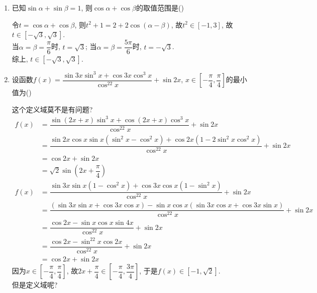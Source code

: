 \begin{enumerate}
\item 已知$\sin\alpha+\sin\beta=1$, 则$\cos\alpha+\cos\beta$的取值范围是\dotfill()
\begin{jieda}
令$t=\cos\alpha+\cos\beta$, 则$t^2+1=2+2\cos(\alpha-\beta)$, 故$t^2\in[-1,3]$, 故$t\in[-\sqrt{3},\sqrt{3}]$. \\
当$\alpha=\beta=\dfrac{\pi}{6}$时, $t=\sqrt{3}$; 当$\alpha=\beta=\dfrac{5\pi}{6}$时, $t=-\sqrt{3}$. \\
综上, $t\in[-\sqrt{3},\sqrt{3}]$. 
\end{jieda}


\item 设函数$f(x)=\dfrac{\sin3x\sin^3x+\cos3x\cos^3x}{\cos^22x}+\sin2x$, $x\in\left[-\dfrac{\pi}{4},\dfrac{\pi}{4}\right]$的最小值为\dotfill()
\begin{jieda}
这个定义域莫不是有问题? 
\begin{align*}
f(x)
& = \dfrac{\sin(2x+x)\sin^3x+\cos(2x+x)\cos^3x}{\cos^22x}+\sin2x\\
& = \dfrac{\sin2x\cos{x}\sin{x}(\sin^2x-\cos^2x)+\cos2x(1-2\sin^2x\cos^2x)}{\cos^22x}+\sin2x\\
& = \cos2x+\sin2x\\
& = \sqrt{2}\sin\left(2x+\dfrac{\pi}{4}\right)
\end{align*}
\begin{align*}
f(x)
& = \dfrac{\sin3x\sin{x}(1-\cos^2x)+\cos3x\cos{x}(1-\sin^2x)}{\cos^22x}+\sin2x\\
& = \dfrac{(\sin3x\sin{x}+\cos3x\cos{x})-\sin{x}\cos{x}(\sin3x\cos{x}+\cos3x\sin{x})}{\cos^22x}+\sin2x\\
& = \dfrac{\cos2x-\sin{x}\cos{x}\sin4x}{\cos^22x}+\sin2x\\
& = \dfrac{\cos2x-\sin^22x\cos2x}{\cos^22x}+\sin2x\\
& = \cos2x+\sin2x
\end{align*}
因为$x\in\left[-\dfrac{\pi}{4},\dfrac{\pi}{4}\right]$, 故$2x+\dfrac{\pi}{4}\in\left[-\dfrac{\pi}{4},\dfrac{3\pi}{4}\right]$, 
于是$f(x)\in[-1,\sqrt{2}]$. \\
但是定义域呢? 
\end{jieda}



\end{enumerate}
